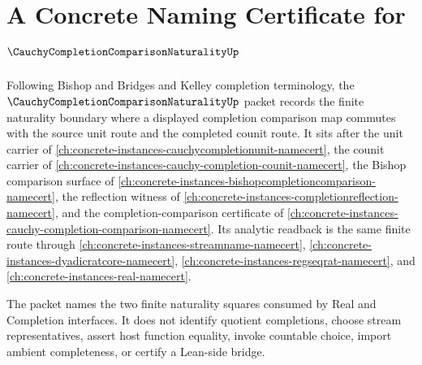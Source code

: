 \chapter{A Concrete Naming Certificate for $\CauchyCompletionComparisonNaturalityUp$}
\label{ch:concrete-instances-cauchy-completion-comparison-naturality-namecert}

Following Bishop and Bridges and Kelley completion terminology, the $\CauchyCompletionComparisonNaturalityUp$ packet records the finite naturality boundary where a displayed completion comparison map commutes with the source unit route and the completed counit route. It sits after the unit carrier of \autoref{ch:concrete-instances-cauchycompletionunit-namecert}, the counit carrier of \autoref{ch:concrete-instances-cauchy-completion-counit-namecert}, the Bishop comparison surface of \autoref{ch:concrete-instances-bishopcompletioncomparison-namecert}, the reflection witness of \autoref{ch:concrete-instances-completionreflection-namecert}, and the completion-comparison certificate of \autoref{ch:concrete-instances-cauchy-completion-comparison-namecert}. Its analytic readback is the same finite route through \autoref{ch:concrete-instances-streamname-namecert}, \autoref{ch:concrete-instances-dyadicratcore-namecert}, \autoref{ch:concrete-instances-regseqrat-namecert}, and \autoref{ch:concrete-instances-real-namecert}.

The packet names the two finite naturality squares consumed by Real and Completion interfaces. It does not identify quotient completions, choose stream representatives, assert host function equality, invoke countable choice, import ambient completeness, or certify a Lean-side bridge.

